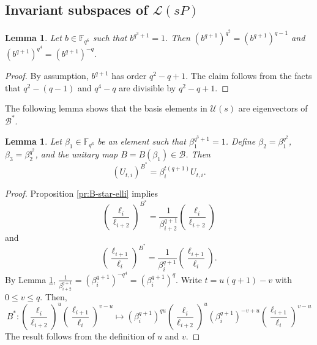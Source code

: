 \documentclass[a4paper]{amsart}
\theoremstyle{plain}
\newtheorem{lemma}[theorem]{Lemma}
\theoremstyle{definition}
\theoremstyle{remark}
\begin{document}
\subsection{Invariant subspaces of $\mathscr{L}(sP)$}

\begin{lemma} \label{lm:b-q+1}
Let $b\in \mathbb{F}_{q^6}$ such that $b^{q^3+1}=1$. Then $(b^{q+1})^{q^2}=(b^{q+1})^{q-1}$ and $(b^{q+1})^{q^4}=(b^{q+1})^{-q}$.
\end{lemma}
\begin{proof}
By assumption, $b^{q+1}$ has order $q^2-q+1$. The claim follows from the facts that $q^2-(q-1)$ and $q^4-q$ are divisible by $q^2-q+1$. 
\end{proof}

The following lemma shows that the basis elements in $\mathcal{U}(s)$ are eigenvectors of $\mathcal{B}^*$. 

\begin{lemma} \label{lm:B-start-on-U}
Let $\beta_1 \in \mathbb{F}_{q^6}$ be an element such that $\beta_1^{q^3+1}=1$. Define $\beta_2=\beta_1^{q^2}$, $\beta_3=\beta_2^{q^2}$, and the unitary map $B=B(\beta_1) \in \mathcal{B}$. Then
\[(U_{t,i})^{B^*} = \beta_i^{t(q+1)} U_{t,i}.\]
\end{lemma}
\begin{proof}
Proposition \ref{pr:B-star-elli} implies
\[\left(\frac{\ell_i}{\ell_{i+2}}\right)^{B^*} = \frac{1}{\beta_{i+2}^{q+1}}\left(\frac{\ell_i}{\ell_{i+2}}\right)\]
and
\[\left(\frac{\ell_{i+1}}{\ell_{i}}\right)^{B^*} = \frac{1}{\beta_{i}^{q+1}}
\left(\frac{\ell_{i+1}}{\ell_{i}}\right).\]
By Lemma \ref{lm:b-q+1}, $\frac{1}{\beta_{i+2}^{q+1}} = (\beta_{i}^{q+1})^{-q^4} = (\beta_{i}^{q+1})^{q}$. Write $t=u(q+1)-v$ with $0\leq v\leq q$. Then, 
\[B^*: \left(\frac{\ell_i}{\ell_{i+2}}\right)^u\left(\frac{\ell_{i+1}}{\ell_i}\right)^{v-u} \mapsto (\beta_i^{q+1})^{qu}  \left(\frac{\ell_i}{\ell_{i+2}}\right)^u (\beta_{i}^{q+1})^{-v+u} \left(\frac{\ell_{i+1}}{\ell_i}\right)^{v-u}\]
The result follows from the definition of $u$ and $v$. 
\end{proof}
\end{document}
